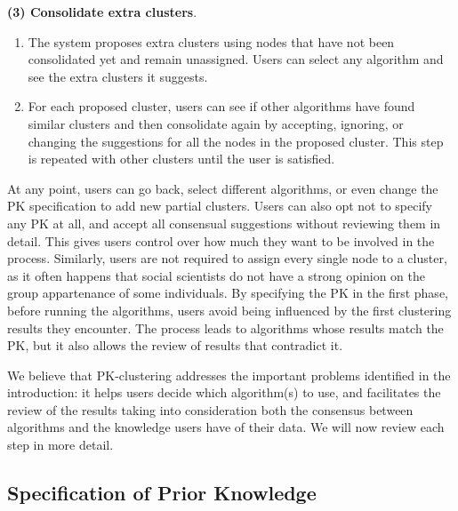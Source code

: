 \noindent \textbf{(3) Consolidate extra clusters}.
\begin{enumerate}[left=.3em,nosep,label={\arabic*}.,start=7,itemindent=0pt]
\item The system proposes extra clusters using nodes that have not been consolidated yet and remain unassigned. Users can select any algorithm and see the extra clusters it suggests.
\item For each proposed cluster, users can see if other algorithms have found similar clusters and then consolidate again by accepting, ignoring, or changing the suggestions for all the nodes in the proposed cluster. This step is repeated with other clusters until the user is satisfied.
\end{enumerate}

At any point, users can go back, select different algorithms, or even change the PK specification to add new partial clusters.  Users can also opt not to specify any PK at all, and accept all consensual suggestions without reviewing them in detail. This gives users control over how much they want to be involved in the process. Similarly, users are not required to assign every single node to a cluster, as it often happens that social scientists do not have a strong opinion on the group appartenance of some individuals.
By specifying the PK in the first phase, before running the algorithms, users avoid being influenced by the first clustering results they encounter.  The process leads to algorithms whose results match the PK, but it also allows the review of results that contradict it.


We believe that PK-clustering addresses the important problems identified in the introduction: it helps users decide which algorithm(s) to use, and facilitates the review of the results taking into consideration both the consensus between algorithms and the knowledge users have of their data.
We will now review each step in more detail.




\subsection{Specification of Prior Knowledge}

